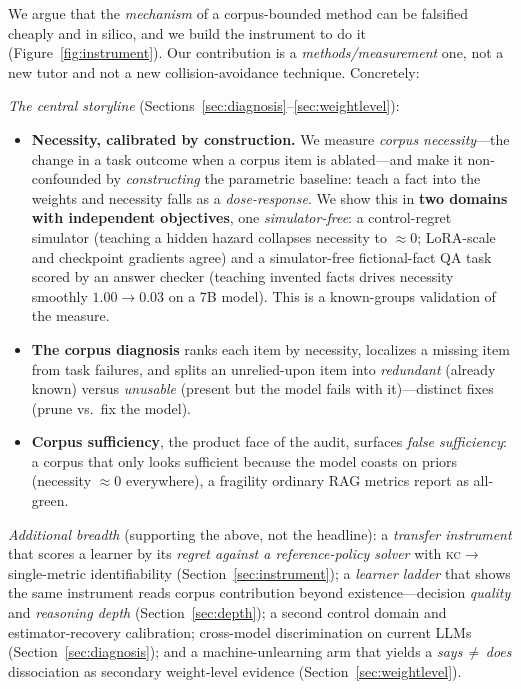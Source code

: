 \documentclass{article}
\newcommand{\kc}{\textsc{kc}}
\begin{document}
We argue that the \emph{mechanism} of a corpus-bounded method can be falsified cheaply and
in silico, and we build the instrument to do it (Figure~\ref{fig:instrument}). Our contribution is a
\emph{methods/measurement} one, not a new tutor and not a new collision-avoidance
technique. Concretely:

\emph{The central storyline} (Sections~\ref{sec:diagnosis}--\ref{sec:weightlevel}):

\begin{itemize}
  \item \textbf{Necessity, calibrated by construction.} We measure \emph{corpus necessity}---the
  change in a task outcome when a corpus item is ablated---and make it non-confounded by
  \emph{constructing} the parametric baseline: teach a fact into the weights and necessity falls
  as a \emph{dose-response}. We show this in \textbf{two domains with independent objectives},
  one \emph{simulator-free}: a control-regret simulator (teaching a hidden hazard collapses
  necessity to $\approx 0$; LoRA-scale and checkpoint gradients agree) and a simulator-free
  fictional-fact QA task scored by an answer checker (teaching invented facts drives necessity
  smoothly $1.00\!\to\!0.03$ on a 7B model). This is a known-groups validation of the measure.
  \item \textbf{The corpus diagnosis} ranks each item by necessity, localizes a missing item from
  task failures, and splits an unrelied-upon item into \emph{redundant} (already known) versus
  \emph{unusable} (present but the model fails with it)---distinct fixes (prune vs.\ fix the model).
  \item \textbf{Corpus sufficiency}, the product face of the audit, surfaces \emph{false
  sufficiency}: a corpus that only looks sufficient because the model coasts on priors (necessity
  $\approx 0$ everywhere), a fragility ordinary RAG metrics report as all-green.
\end{itemize}

\emph{Additional breadth} (supporting the above, not the headline): a \emph{transfer instrument}
that scores a learner by its \emph{regret against a reference-policy solver} with
\kc$\to$single-metric identifiability (Section~\ref{sec:instrument}); a \emph{learner ladder} that
shows the same instrument reads corpus contribution beyond existence---decision \emph{quality} and
\emph{reasoning depth} (Section~\ref{sec:depth}); a second control domain and
estimator-recovery calibration; cross-model discrimination on current LLMs
(Section~\ref{sec:diagnosis}); and a machine-unlearning arm that yields a \emph{says\,$\neq$\,does}
dissociation as secondary weight-level evidence (Section~\ref{sec:weightlevel}).
\end{document}
